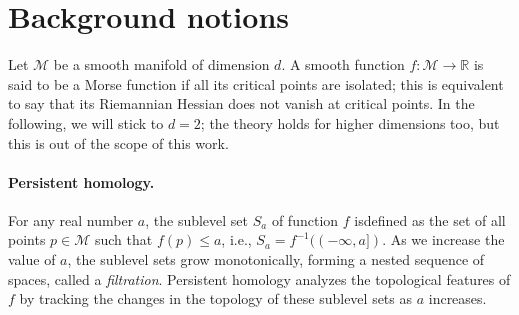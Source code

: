 

\section{Background notions}
\label{sec:basics}
Let ${\mathcal M}$ be a smooth manifold of dimension $d$. 
A smooth function $f:{\mathcal M}\longrightarrow\mathbb{R}$ is said to be a Morse function if all its critical points are isolated; this is equivalent to say that its Riemannian Hessian does not vanish at critical points. 
In the following, we will stick to $d=2$; the theory holds for higher dimensions too, but this is out of the scope of this work. 


\paragraph*{Persistent homology.}
For any real number $a$, the sublevel set $S_a$ of function $f$ isdefined as the set of all points $p\in\mathcal M$ such that $f(p)\leq a$, i.e., $S_a=f^{-1}((-\infty,a])$. 
As we increase the value of $a$, the sublevel sets grow monotonically, forming a nested sequence of spaces, called a \emph{filtration}.
 Persistent homology analyzes the topological features of $f$ by tracking the changes in the topology of these sublevel sets as $a$ increases.
 
